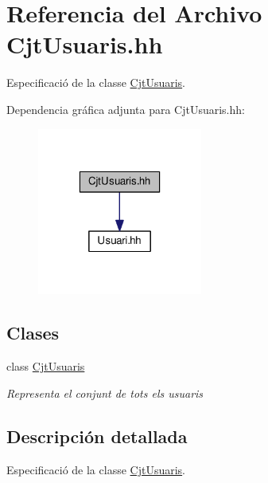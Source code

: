 \hypertarget{_cjt_usuaris_8hh}{}\section{Referencia del Archivo Cjt\+Usuaris.\+hh}
\label{_cjt_usuaris_8hh}


Especificació de la classe \mbox{\hyperlink{class_cjt_usuaris}{Cjt\+Usuaris}}.  


Dependencia gráfica adjunta para Cjt\+Usuaris.\+hh\+:
\nopagebreak
\begin{figure}[H]
\begin{center}
\leavevmode
\includegraphics[width=154pt]{_cjt_usuaris_8hh__incl}
\end{center}
\end{figure}
\subsection*{Clases}
\begin{DoxyCompactItemize}
\item 
class \mbox{\hyperlink{class_cjt_usuaris}{Cjt\+Usuaris}}
\begin{DoxyCompactList}\small\item\em Representa el conjunt de tots els usuaris\end{DoxyCompactList}\end{DoxyCompactItemize}


\subsection{Descripción detallada}
Especificació de la classe \mbox{\hyperlink{class_cjt_usuaris}{Cjt\+Usuaris}}. 

